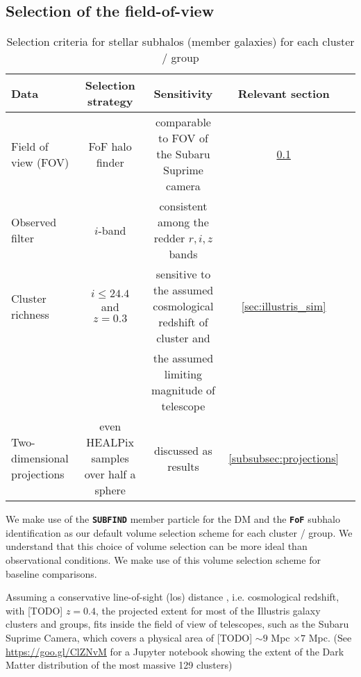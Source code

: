 \subsection{Selection of the field-of-view}
\label{sec:FOV}

\begin{table*}
\begin{center}
\begin{minipage}{180mm} 
	\caption{ Selection criteria for stellar subhalos (member galaxies) for each
		cluster / group 
\label{tab:member_galaxy_selections}} 
	\begin{tabular}{@{}lcccc@{}}
\hline 
Data &  Selection strategy  & Sensitivity & Relevant section  \\ \hline
Field of view (FOV) & FoF halo finder& comparable to FOV of the Subaru
Suprime camera & \ref{sec:FOV}  \\ 
Observed filter & $i$-band & consistent among the redder $r, i, z$ bands &   \\ 
Cluster richness  & $i \leq 24.4$ and $z = 0.3$  & sensitive to
the assumed cosmological redshift of cluster and & \ref{sec:illustris_sim} \\ 
& & the assumed limiting magnitude of telescope &   \\
Two-dimensional projections & even HEALPix samples over half a sphere &
discussed as results  & \ref{subsubsec:projections}\\  
\hline
\end{tabular} 
\label{tab:selection_criteria} 
\footnotesize{
}
\end{minipage}
\end{center} 
\end{table*}

We make use of the {\bf \texttt{SUBFIND}} member particle for the DM and the 
{\bf \texttt{FoF}} subhalo identification as our
default volume selection scheme for each cluster / group.
We understand that this choice of volume selection can be more ideal than
observational conditions. We make use of this volume selection scheme
for baseline comparisons. 

Assuming a conservative line-of-sight (los) distance 
, i.e. cosmological redshift, with [TODO] $z = 0.4$, 
the projected extent for most of the Illustris galaxy clusters and groups, 
fits inside the field of view of telescopes, such as the Subaru Suprime Camera,
which covers a physical area of [TODO] $\sim 9$ Mpc $\times 7$ Mpc. 
(See \href{https://goo.gl/ClZNvM}{https://goo.gl/ClZNvM} for a Jupyter notebook 
showing the extent of the Dark Matter distribution of the most massive 129 clusters)

